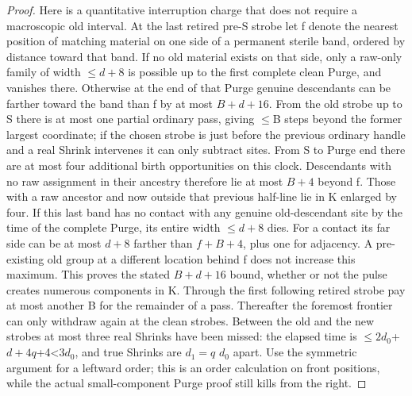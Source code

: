 \begin{proof}
Here is a quantitative interruption charge that does not require a macroscopic old interval. At the last retired pre-S strobe let f denote the nearest position of matching material on one side of a permanent sterile band, ordered by distance toward that band. If no old material exists on that side, only a raw-only family of width \(\le\)\(d+8\) is possible up to the first complete clean Purge, and vanishes there. Otherwise at the end of that Purge genuine descendants can be farther toward the band than f by at most \(B+d+16\). From the old strobe up to S there is at most one partial ordinary pass, giving \(\le\)B steps beyond the former largest coordinate; if the chosen strobe is just before the previous ordinary handle and a real Shrink intervenes it can only subtract sites. From S to Purge end there are at most four additional birth opportunities on this clock. Descendants with no raw assignment in their ancestry therefore lie at most \(B+4\) beyond f. Those with a raw ancestor and now outside that previous half-line lie in K enlarged by four. If this last band has no contact with any genuine old-descendant site by the time of the complete Purge, its entire width \(\le\)\(d+8\) dies. For a contact its far side can be at most \(d+8\) farther than \(f+B+4\), plus one for adjacency. A pre-existing old group at a different location behind f does not increase this maximum. This proves the stated \(B+d+16\) bound, whether or not the pulse creates numerous components in K. Through the first following retired strobe pay at most another B for the remainder of a pass. Thereafter the foremost frontier can only withdraw again at the clean strobes. Between the old and the new strobes at most three real Shrinks have been missed: the elapsed time is \(\le\)\(2d_0\)+\(d+4q\)+4\textless{}\(3d_0\), and true Shrinks are \(d_1=q\) \(d_0\) apart. Use the symmetric argument for a leftward order; this is an order calculation on front positions, while the actual small-component Purge proof still kills from the right.


\end{proof}
